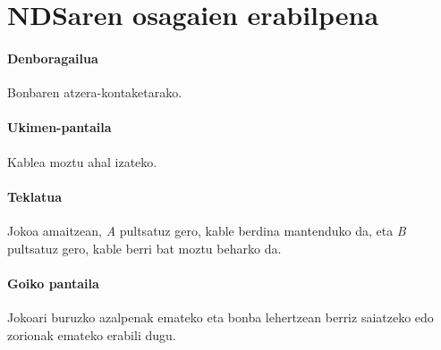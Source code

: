 \documentclass[dvipsnames]{AritzhClass}
\begin{document}
\pagebreak

\section{NDSaren osagaien erabilpena}

\paragraph{Denboragailua} Bonbaren atzera-kontaketarako.

\paragraph{Ukimen-pantaila} Kablea moztu ahal izateko.

\paragraph{Teklatua} Jokoa amaitzean, \textit{A} pultsatuz gero, kable berdina mantenduko da, eta \textit{B} pultsatuz gero, kable berri bat moztu beharko da.

\paragraph{Goiko pantaila} Jokoari buruzko azalpenak emateko eta bonba lehertzean berriz saiatzeko edo zorionak emateko erabili dugu.
\end{document}
